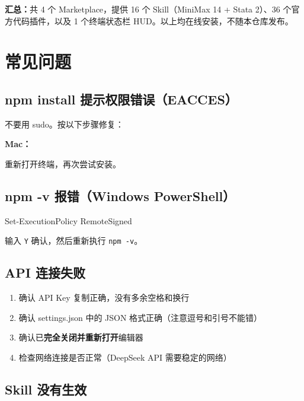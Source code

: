 \documentclass[12pt,a4paper]{ctexart}
\begin{document}
\vspace{8pt}

\textbf{汇总：}共 4 个 Marketplace，提供 16 个 Skill（MiniMax 14 + Stata 2）、36 个官方代码插件，以及 1 个终端状态栏 HUD。以上均在线安装，不随本仓库发布。

\newpage

\section{常见问题}

\subsection{npm install 提示权限错误（EACCES）}

不要用 sudo。按以下步骤修复：

\textbf{Mac：}


重新打开终端，再次尝试安装。

\subsection{npm -v 报错（Windows PowerShell）}

\begin{shcode}
Set-ExecutionPolicy RemoteSigned
\end{shcode}

输入 \texttt{Y} 确认，然后重新执行 \texttt{npm -v}。

\subsection{API 连接失败}

\begin{enumerate}[nosep]
    \item 确认 API Key 复制正确，没有多余空格和换行
    \item 确认 settings.json 中的 JSON 格式正确（注意逗号和引号不能错）
    \item 确认已\textbf{完全关闭并重新打开}编辑器
    \item 检查网络连接是否正常（DeepSeek API 需要稳定的网络）
\end{enumerate}

\subsection{Skill 没有生效}
\end{document}
